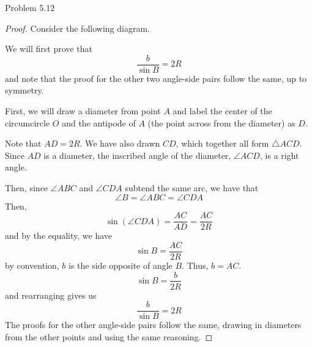 \begin{sol}{Problem 5.12}
\begin{proof}

Consider the following diagram.

We will first prove that 
\[
\frac{b}{\sin B } = 2R
\]
and note that the proof for the other two angle-side pairs follow the same, up to symmetry. 

First, we will draw a diameter from point $A$ and label the center of the circumcircle $O$ and the antipode of $A$ (the point across from the diameter) as $D$. 

\begin{center}
\end{center}
Note that $AD = 2R$. We have also drawn $CD$, which together all form $\triangle ACD$. Since $AD$ is a diameter, the inscribed angle of the diameter, $\angle ACD$, is a right angle. 

Then, since $\angle ABC$ and $\angle CDA$ subtend the same arc, we have that
\[
\angle B = \angle ABC = \angle CDA
\]
Then, 
\[
\sin(\angle CDA) = \frac{AC}{AD} = \frac{AC}{2R}
\]
and by the equality, we have
\[
\sin B = \frac{AC}{2R}
\]
by convention, $b$ is the side opposite of angle $B$. Thus, $b = AC$. 
\[
\sin B = \frac{b}{2R}
\]
and rearranging gives us
\[
\frac{b}{\sin B} = 2R
\]
The proofs for the other angle-side pairs follow the same, drawing in diameters from the other points and using the same reasoning.
\end{proof}
\end{sol}

